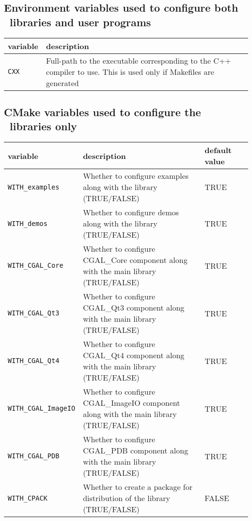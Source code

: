 \subsection{Environment variables used to configure both \cgal\ libraries and user programs}

\begin{center}
  \renewcommand{\arraystretch}{1.3}
  \gdef\lcTabularBorder{2}
  \begin{tabular}{|l|l|} \hline
    \textbf{variable}  & \textbf{description} 
    \\\hline\hline
    {\tt CXX } & Full-path to the executable corresponding to the C++ compiler to use. This is used only if Makefiles are generated
    \\\hline
  \end{tabular}
\end{center}

\subsection{CMake variables used to configure the \cgal\ libraries only}

\begin{center}
  \renewcommand{\arraystretch}{1.3}
  \gdef\lcTabularBorder{2}
  \begin{tabular}{|l|l|l|l|} \hline
    \textbf{variable} & \textbf{description} & \textbf{default value}
    \\\hline\hline
    \texttt{WITH\_examples}  & Whether to configure examples along with the library (TRUE/FALSE) & TRUE
    \\\hline
    \texttt{WITH\_demos} & Whether to configure demos along with the library (TRUE/FALSE) & TRUE
    \\\hline
    \texttt{WITH\_CGAL\_Core} & Whether to configure CGAL\_Core component along with the main library (TRUE/FALSE) & TRUE
    \\\hline
    \texttt{WITH\_CGAL\_Qt3} & Whether to configure CGAL\_Qt3 component along with the main library (TRUE/FALSE) & TRUE
    \\\hline
    \texttt{WITH\_CGAL\_Qt4} & Whether to configure CGAL\_Qt4 component along with the main library (TRUE/FALSE) & TRUE
    \\\hline
    \texttt{WITH\_CGAL\_ImageIO} & Whether to configure CGAL\_ImageIO component along with the main library (TRUE/FALSE) & TRUE
    \\\hline
    \texttt{WITH\_CGAL\_PDB} & Whether to configure CGAL\_PDB component along with the main library (TRUE/FALSE) & TRUE
    \\\hline
    \texttt{WITH\_CPACK} & Whether to create a package for distribution of the library (TRUE/FALSE) & FALSE
    \\\hline
  \end{tabular}
\end{center}


